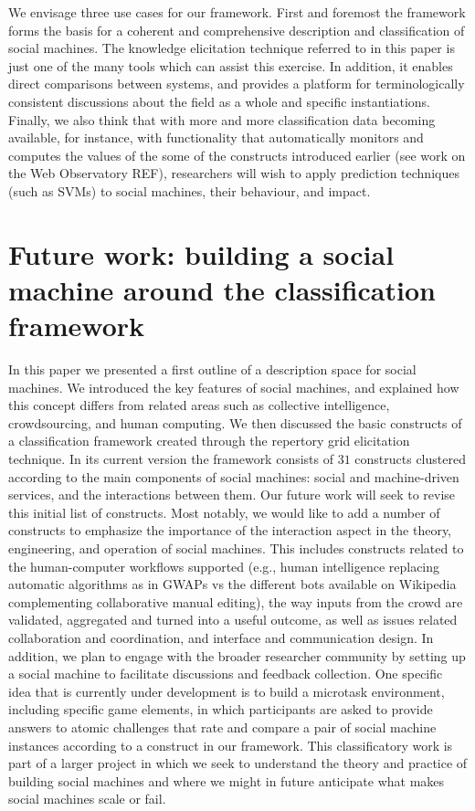 \documentclass{sig-alternate}
\begin{document}
We envisage three use cases for our framework. First and foremost the framework forms the basis for a coherent and comprehensive description and classification of social machines. The knowledge elicitation technique referred to in this paper is just one of the many tools which can assist this exercise. In addition, it enables direct comparisons between systems, and provides a platform for terminologically consistent discussions about the field as a whole and specific instantiations. Finally, we also think that with more and more classification data becoming available, for instance, with functionality that automatically monitors and computes the values of the some of the constructs introduced earlier (see work on the Web Observatory REF), researchers will wish to apply prediction techniques (such as SVMs) to social machines, their behaviour, and impact.

\section{Future work: building a social machine around the classification framework}
In this paper we presented a first outline of a description space for social machines. We introduced the key features of social machines, and explained how this concept differs from related areas such as collective intelligence, crowdsourcing, and human computing. We then discussed the basic constructs of a classification framework created through the repertory grid elicitation technique. In its current version the framework consists of $31$ constructs clustered according to the main components of social machines: social and machine-driven services, and the interactions between them. Our future work will seek to revise this initial list of constructs. Most notably, we would like to add a number of constructs to emphasize the importance of the interaction aspect in the theory, engineering, and operation of social machines. This includes constructs related to the human-computer workflows supported (e.g., human intelligence replacing automatic algorithms as in GWAPs vs the different bots available on Wikipedia complementing collaborative manual editing), the way inputs from the crowd are validated, aggregated and turned into a useful outcome, as well as issues related collaboration and coordination, and interface and communication design. In addition, we plan to engage with the broader researcher community by setting up a social machine to facilitate discussions and feedback collection. One specific idea that is currently under development is to build a microtask environment, including specific game elements, in which participants are asked to provide answers to atomic challenges that rate and compare a pair of social machine instances according to a construct in our framework. This classificatory work is part of a larger project in which we seek to understand the theory and practice of building social machines and where we might in future anticipate what makes social machines scale or fail.
\end{document}
